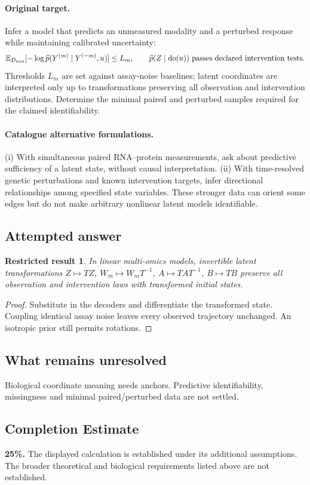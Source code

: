 \documentclass[11pt]{article}
\newcommand{\E}{\mathbb E}
\providecommand{\E}{\mathbb E}
\newtheorem{attemptresult}{Restricted result}[section]
\begin{document}
\paragraph{Original target.}
Infer a model that predicts an unmeasured modality and a perturbed response while maintaining calibrated uncertainty:
\[\E_{D_{\rm test}}[-\log\widehat p(Y^{(m)}\mid Y^{(-m)},u)]\le L_m,\qquad \widehat p(Z\mid\operatorname{do}(u))\ \text{passes declared intervention tests}.\]
Thresholds $L_m$ are set against assay-noise baselines; latent coordinates are interpreted only up to transformations preserving all observation and intervention distributions. Determine the minimal paired and perturbed samples required for the claimed identifiability.
\paragraph{Catalogue alternative formulations.}
(i) With simultaneous paired RNA--protein measurements, ask about predictive sufficiency of a latent state, without causal interpretation. (ii) With time-resolved genetic perturbations and known intervention targets, infer directional relationships among specified state variables. These stronger data can orient some edges but do not make arbitrary nonlinear latent models identifiable.
\subsection{Attempted answer}
\begin{attemptresult}
In linear multi-omics models, invertible latent transformations $Z\mapsto TZ$, $W_m\mapsto W_mT^{-1}$, $A\mapsto TAT^{-1}$, $B\mapsto TB$ preserve all observation and intervention laws with transformed initial states.
\end{attemptresult}
\begin{proof}
Substitute in the decoders and differentiate the transformed state. Coupling identical assay noise leaves every observed trajectory unchanged. An isotropic prior still permits rotations.
\end{proof}
\subsection{What remains unresolved}
Biological coordinate meaning needs anchors. Predictive identifiability, missingness and minimal paired/perturbed data are not settled.
\subsection{Completion Estimate}
\textbf{25\%.} The displayed calculation is established under its additional assumptions. The broader theoretical and biological requirements listed above are not established.
\end{document}
